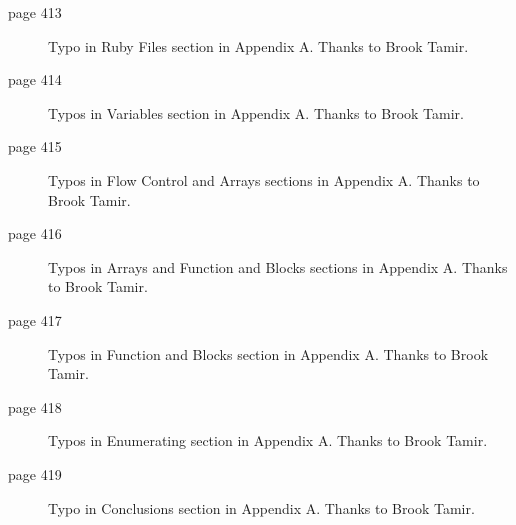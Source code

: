 \begin{small}
\begin{description}
	\item[page 413] Typo in Ruby Files section in Appendix A. Thanks to Brook Tamir.
	\item[page 414] Typos in Variables section in Appendix A. Thanks to Brook Tamir.
	\item[page 415] Typos in Flow Control and Arrays sections in Appendix A. Thanks to Brook Tamir.
	\item[page 416] Typos in Arrays and Function and Blocks sections in Appendix A. Thanks to Brook Tamir.
	\item[page 417] Typos in Function and Blocks section in Appendix A. Thanks to Brook Tamir.
	\item[page 418] Typos in Enumerating section in Appendix A. Thanks to Brook Tamir.
	\item[page 419] Typo in Conclusions section in Appendix A. Thanks to Brook Tamir.
\end{description}

\end{small}
